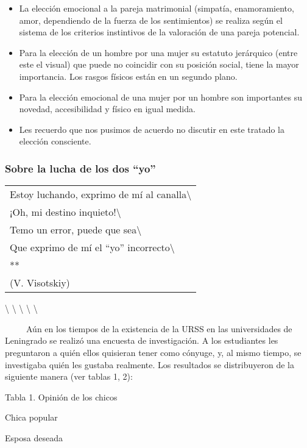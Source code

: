 \begin{itemize}
\tightlist
\item
  La elección emocional a la pareja matrimonial (simpatía,
  enamoramiento, amor, dependiendo de la fuerza de los sentimientos) se
  realiza según el sistema de los criterios instintivos de la valoración
  de una pareja potencial.
\item
  Para la elección de un hombre por una mujer su estatuto jerárquico
  (entre este el visual) que puede no coincidir con su posición social,
  tiene la mayor importancia. Los rasgos físicos están en un segundo
  plano.
\item
  Para la elección emocional de una mujer por un hombre son importantes
  su novedad, accesibilidad y físico en igual medida.
\item
  Les recuerdo que nos pusimos de acuerdo no discutir en este tratado la
  elección consciente.
\end{itemize}

\protect\hypertarget{M11}{}{}

\subsubsection{\texorpdfstring{Sobre la lucha de los dos
``yo''}{Sobre la lucha de los dos yo}}\label{sobre-la-lucha-de-los-dos-yo}

\begin{longtable}[]{@{}l@{}}
\toprule
Estoy luchando, exprimo de mí al canalla\textbackslash{}\tabularnewline
¡Oh, mi destino inquieto!\textbackslash{}\tabularnewline
Temo un error, puede que sea\textbackslash{}\tabularnewline
Que exprimo de mí el ``yo'' incorrecto\textbackslash{}\tabularnewline
**\tabularnewline
(V. Visotskiy)\tabularnewline
\bottomrule
\end{longtable}

\textbackslash{} \textbackslash{} \textbackslash{} \textbackslash{}
\textbackslash{}

~ ~ ~ Aún en los tiempos de la existencia de la URSS en las
universidades de Leningrado se realizó una encuesta de investigación. A
los estudiantes les preguntaron a quién ellos quisieran tener como
cónyuge, y, al mismo tiempo, se investigaba quién les gustaba realmente.
Los resultados se distribuyeron de la siguiente manera (ver tablas 1,
2):

Tabla 1. Opinión de los chicos

Chica popular

Esposa deseada

